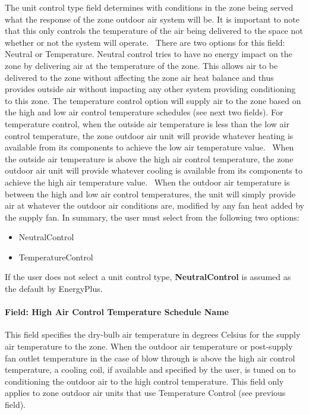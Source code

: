 The unit control type field determines with conditions in the zone being served what the response of the zone outdoor air system will be. It is important to note that this only controls the temperature of the air being delivered to the space not whether or not the system will operate.~ There are two options for this field: Neutral or Temperature. Neutral control tries to have no energy impact on the zone by delivering air at the temperature of the zone. This allows air to be delivered to the zone without affecting the zone air heat balance and thus provides outside air without impacting any other system providing conditioning to this zone. The temperature control option will supply air to the zone based on the high and low air control temperature schedules (see next two fields). For temperature control, when the outside air temperature is less than the low air control temperature, the zone outdoor air unit will provide whatever heating is available from its components to achieve the low air temperature value.~ When the outside air temperature is above the high air control temperature, the zone outdoor air unit will provide whatever cooling is available from its components to achieve the high air temperature value.~ When the outdoor air temperature is between the high and low air control temperatures, the unit will simply provide air at whatever the outdoor air conditions are, modified by any fan heat added by the supply fan. In summary, the user must select from the following two options:

\begin{itemize}
\item
  NeutralControl
\item
  TemperatureControl
\end{itemize}

If the user does not select a unit control type, \textbf{NeutralControl} is assumed as the default by EnergyPlus.

\paragraph{Field: High Air Control Temperature Schedule Name}\label{field-high-air-control-temperature-schedule-name}

This field specifies the dry-bulb air temperature in degrees Celsius for the supply air temperature to the zone. When the outdoor air temperature or post-supply fan outlet temperature in the case of blow through is above the high air control temperature, a cooling coil, if available and specified by the user, is tuned on to conditioning the outdoor air to the high control temperature. This field only applies to zone outdoor air units that use Temperature Control (see previous field).

